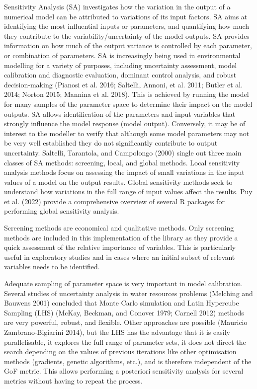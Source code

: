 Sensitivity Analysis (SA) investigates how the variation in the output of a numerical model can be attributed to variations of its input factors. SA aims at identifying the most influential inputs or parameters, and quantifying how much they contribute to the variability/uncertainty of the model outputs. SA provides information on how much of the output variance is controlled by each parameter, or combination of parameters. SA is increasingly being used in environmental modelling for a variety of purposes, including uncertainty assessment, model calibration and diagnostic evaluation, dominant control analysis, and robust decision-making (Pianosi et al. 2016; Saltelli, Annoni, et al. 2011; Butler et al. 2014; Norton 2015; Mannina et al. 2018). This is achieved by running the model for many samples of the parameter space to determine their impact on the model outputs. SA allows identification of the parameters and input variables that strongly influence the model response (model output). Conversely, it may be of interest to the modeller to verify that although some model parameters may not be very well established they do not significantly contribute to output uncertainty. Saltelli, Tarantola, and Campolongo (2000) single out three main classes of SA methods: screening, local, and global methods. Local sensitivity analysis methods focus on assessing the impact of small variations in the input values of a model on the output results. Global sensitivity methods seek to understand how variations in the full range of input values affect the results. Puy et al. (2022) provide a comprehensive overview of several R packages for performing global sensitivity analysis.

Screening methods are economical and qualitative methods. Only screening methods are included in this implementation of the library as they provide a quick assessment of the relative importance of variables. This is particularly useful in exploratory studies and in cases where an initial subset of relevant variables needs to be identified.

Adequate sampling of parameter space is very important in model calibration. Several studies of uncertainty analysis in water resources problems (Melching and Bauwens 2001) concluded that Monte Carlo simulation and Latin Hypercube Sampling (LHS) (McKay, Beckman, and Conover 1979; Carnell 2012) methods are very powerful, robust, and flexible. Other approaches are possible (Mauricio Zambrano-Bigiarini 2014), but the LHS has the advantage that it is easily parallelisable, it explores the full range of parameter sets, it does not direct the search depending on the values of previous iterations like other optimisation methods (gradients, genetic algorithms, etc.), and is therefore independent of the GoF metric. This allows performing a posteriori sensitivity analysis for several metrics without having to repeat the process.

